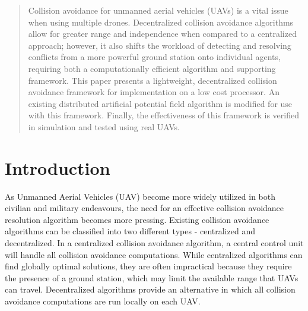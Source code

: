 \documentclass[conference]{IEEEtran}
\begin{document}
\begin{abstract}
Collision avoidance for unmanned aerial vehicles (UAVs) is a vital issue when using multiple drones. Decentralized collision avoidance algorithms allow for greater range and independence when compared to a centralized approach; however, it also shifts the workload of detecting and resolving conflicts from a more powerful ground station onto individual agents, requiring both a computationally efficient algorithm and supporting framework. This paper presents a lightweight, decentralized collision avoidance framework for implementation on a low cost processor. An existing distributed artificial potential field algorithm is modified for use with this framework. Finally, 
the effectiveness of this framework is verified in simulation and tested using real UAVs. 
\end{abstract}




%
\IEEEpeerreviewmaketitle



\section{Introduction}


As Unmanned Aerial Vehicles (UAV) become more widely utilized in both civilian and military endeavours, the need for an effective collision avoidance resolution algorithm becomes more pressing. 
Existing collision avoidance algorithms can be classified into two different types - centralized and decentralized.  
In a centralized collision avoidance algorithm, a central control unit will handle all collision avoidance computations. 
While centralized algorithms can find globally optimal solutions, they are often impractical because they require the presence of a ground station, which may limit the available range that UAVs can travel. Decentralized algorithms provide an alternative in which all collision avoidance computations are run locally on each UAV.
\end{document}
